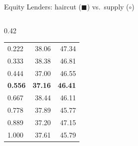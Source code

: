 \documentclass[aspectratio=169,10pt]{beamer}
\begin{document}
\begin{frame}{Equity Lenders: haircut ($\blacksquare$) vs.\ supply ($\circ$)}
\begin{columns}[T]
\begin{column}{0.42\textwidth}
\begin{tabular}{lrr}
        0.222 & 38.06 & 47.34 \\
        0.333 & 38.38 & 46.81 \\
        0.444 & 37.00 & 46.55 \\
        \textbf{0.556} & \textbf{37.16} & \textbf{46.41} \\
        0.667 & 38.44 & 46.11 \\
        0.778 & 37.89 & 45.77 \\
        0.889 & 37.20 & 47.15 \\
        1.000 & 37.61 & 45.79 \\
        \bottomrule
      \end{tabular}
    \end{column}
  \end{columns}
\end{frame}
\end{document}
